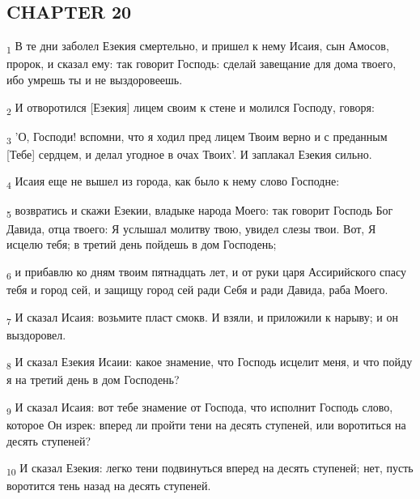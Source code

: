 \subsection{CHAPTER 20}
\begin{tcolorbox}
\textsubscript{1} В те дни заболел Езекия смертельно, и пришел к нему Исаия, сын Амосов, пророк, и сказал ему: так говорит Господь: сделай завещание для дома твоего, ибо умрешь ты и не выздоровеешь.
\end{tcolorbox}
\begin{tcolorbox}
\textsubscript{2} И отворотился [Езекия] лицем своим к стене и молился Господу, говоря:
\end{tcolorbox}
\begin{tcolorbox}
\textsubscript{3} 'О, Господи! вспомни, что я ходил пред лицем Твоим верно и с преданным [Тебе] сердцем, и делал угодное в очах Твоих'. И заплакал Езекия сильно.
\end{tcolorbox}
\begin{tcolorbox}
\textsubscript{4} Исаия еще не вышел из города, как было к нему слово Господне:
\end{tcolorbox}
\begin{tcolorbox}
\textsubscript{5} возвратись и скажи Езекии, владыке народа Моего: так говорит Господь Бог Давида, отца твоего: Я услышал молитву твою, увидел слезы твои. Вот, Я исцелю тебя; в третий день пойдешь в дом Господень;
\end{tcolorbox}
\begin{tcolorbox}
\textsubscript{6} и прибавлю ко дням твоим пятнадцать лет, и от руки царя Ассирийского спасу тебя и город сей, и защищу город сей ради Себя и ради Давида, раба Моего.
\end{tcolorbox}
\begin{tcolorbox}
\textsubscript{7} И сказал Исаия: возьмите пласт смокв. И взяли, и приложили к нарыву; и он выздоровел.
\end{tcolorbox}
\begin{tcolorbox}
\textsubscript{8} И сказал Езекия Исаии: какое знамение, что Господь исцелит меня, и что пойду я на третий день в дом Господень?
\end{tcolorbox}
\begin{tcolorbox}
\textsubscript{9} И сказал Исаия: вот тебе знамение от Господа, что исполнит Господь слово, которое Он изрек: вперед ли пройти тени на десять ступеней, или воротиться на десять ступеней?
\end{tcolorbox}
\begin{tcolorbox}
\textsubscript{10} И сказал Езекия: легко тени подвинуться вперед на десять ступеней; нет, пусть воротится тень назад на десять ступеней.
\end{tcolorbox}
